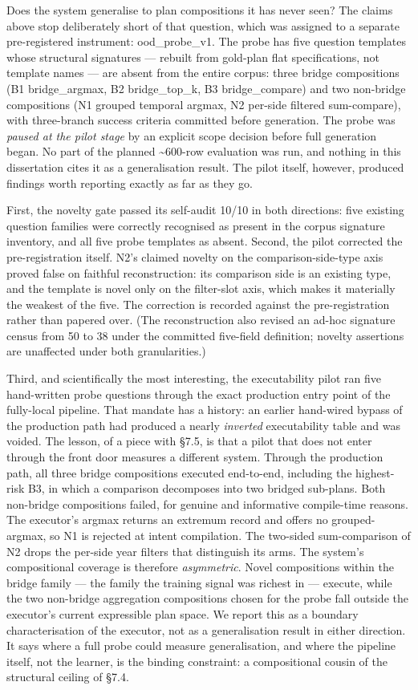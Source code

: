 Does the system generalise to plan compositions it has never seen? The claims above stop deliberately short of that question, which was assigned to a separate pre-registered instrument: ood\_probe\_v1. The probe has five question templates whose structural signatures --- rebuilt from gold-plan flat specifications, not template names --- are absent from the entire corpus: three bridge compositions (B1 bridge\_argmax, B2 bridge\_top\_k, B3 bridge\_compare) and two non-bridge compositions (N1 grouped temporal argmax, N2 per-side filtered sum-compare), with three-branch success criteria committed before generation. The probe was \emph{paused at the pilot stage} by an explicit scope decision before full generation began. No part of the planned \textasciitilde{}600-row evaluation was run, and nothing in this dissertation cites it as a generalisation result. The pilot itself, however, produced findings worth reporting exactly as far as they go.

First, the novelty gate passed its self-audit 10/10 in both directions: five existing question families were correctly recognised as present in the corpus signature inventory, and all five probe templates as absent. Second, the pilot corrected the pre-registration itself. N2's claimed novelty on the comparison-side-type axis proved false on faithful reconstruction: its comparison side is an existing type, and the template is novel only on the filter-slot axis, which makes it materially the weakest of the five. The correction is recorded against the pre-registration rather than papered over. (The reconstruction also revised an ad-hoc signature census from 50 to 38 under the committed five-field definition; novelty assertions are unaffected under both granularities.)

Third, and scientifically the most interesting, the executability pilot ran five hand-written probe questions through the exact production entry point of the fully-local pipeline. That mandate has a history: an earlier hand-wired bypass of the production path had produced a nearly \emph{inverted} executability table and was voided. The lesson, of a piece with \S7.5, is that a pilot that does not enter through the front door measures a different system. Through the production path, all three bridge compositions executed end-to-end, including the highest-risk B3, in which a comparison decomposes into two bridged sub-plans. Both non-bridge compositions failed, for genuine and informative compile-time reasons. The executor's argmax returns an extremum record and offers no grouped-argmax, so N1 is rejected at intent compilation. The two-sided sum-comparison of N2 drops the per-side year filters that distinguish its arms. The system's compositional coverage is therefore \emph{asymmetric}. Novel compositions within the bridge family --- the family the training signal was richest in --- execute, while the two non-bridge aggregation compositions chosen for the probe fall outside the executor's current expressible plan space. We report this as a boundary characterisation of the executor, not as a generalisation result in either direction. It says where a full probe could measure generalisation, and where the pipeline itself, not the learner, is the binding constraint: a compositional cousin of the structural ceiling of \S7.4.

